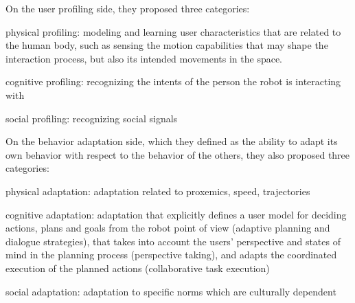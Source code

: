 \documentclass[a4paper,11pt,twoside]{StyleThese}
\begin{document}
On the user profiling side, they proposed three categories: 
\begin{bulletList}
	\item physical profiling: modeling and learning user characteristics that are related to the human body, such as sensing the motion capabilities that may shape the interaction process, but also its intended movements in the space. 
	\item cognitive profiling: recognizing the intents of the person the robot is interacting with
	\item social profiling: recognizing social signals
\end{bulletList}
On the behavior adaptation side, which they defined as the ability to adapt its own behavior with respect to the behavior of the others, they also proposed three categories:
\begin{bulletList}
	\item physical adaptation: adaptation related to proxemics, speed, trajectories 
	\item cognitive adaptation: adaptation that explicitly defines a user model for deciding actions, plans and goals from the robot point of view (adaptive planning and dialogue strategies), that takes into account the users’ perspective and states of mind in the planning process (perspective taking), and adapts the coordinated execution of the planned actions (collaborative task execution)
	\item social adaptation: adaptation to specific norms which are culturally dependent
\end{bulletList}
\end{document}
